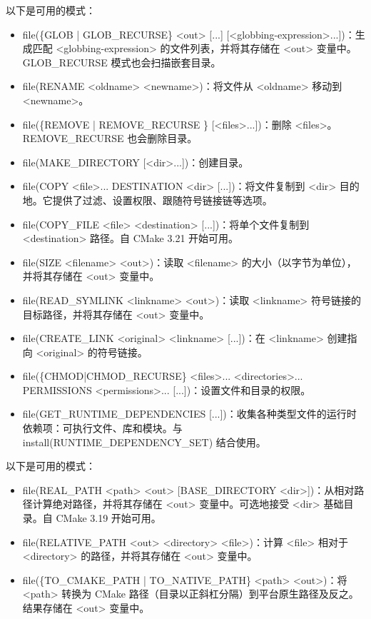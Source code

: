 
以下是可用的模式：

\begin{itemize}
\item
file(\{GLOB | GLOB\_RECURSE\} <out> [...] [<globbing-expression>...])：生成匹配 <globbing-expression> 的文件列表，并将其存储在 <out> 变量中。GLOB\_RECURSE 模式也会扫描嵌套目录。

\item
file(RENAME <oldname> <newname>)：将文件从 <oldname> 移动到 <newname>。

\item
file(\{REMOVE | REMOVE\_RECURSE \} [<files>...])：删除 <files>。REMOVE\_RECURSE 也会删除目录。

\item
file(MAKE\_DIRECTORY [<dir>...])：创建目录。

\item
file(COPY <file>... DESTINATION <dir> [...])：将文件复制到 <dir> 目的地。它提供了过滤、设置权限、跟随符号链接链等选项。

\item
file(COPY\_FILE <file> <destination> [...])：将单个文件复制到 <destination> 路径。自 CMake 3.21 开始可用。

\item
file(SIZE <filename> <out>)：读取 <filename> 的大小（以字节为单位），并将其存储在 <out> 变量中。

\item
file(READ\_SYMLINK <linkname> <out>)：读取 <linkname> 符号链接的目标路径，并将其存储在 <out> 变量中。

\item
file(CREATE\_LINK <original> <linkname> [...])：在 <linkname> 创建指向 <original> 的符号链接。

\item
file(\{CHMOD|CHMOD\_RECURSE\} <files>... <directories>... PERMISSIONS <permissions>... [...])：设置文件和目录的权限。

\item
file(GET\_RUNTIME\_DEPENDENCIES [...])：收集各种类型文件的运行时依赖项：可执行文件、库和模块。与 install(RUNTIME\_DEPENDENCY\_SET) 结合使用。
\end{itemize}


以下是可用的模式：

\begin{itemize}
\item
file(REAL\_PATH <path> <out> [BASE\_DIRECTORY <dir>])：从相对路径计算绝对路径，并将其存储在 <out> 变量中。可选地接受 <dir> 基础目录。自 CMake 3.19 开始可用。

\item
file(RELATIVE\_PATH <out> <directory> <file>)：计算 <file> 相对于 <directory> 的路径，并将其存储在 <out> 变量中。

\item
file(\{TO\_CMAKE\_PATH | TO\_NATIVE\_PATH\} <path> <out>)：将 <path> 转换为 CMake 路径（目录以正斜杠分隔）到平台原生路径及反之。结果存储在 <out> 变量中。
\end{itemize}


